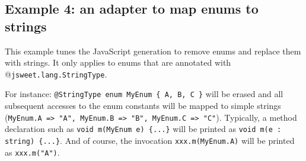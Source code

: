 \documentclass[a4paper]{report}
\begin{document}
\subsection{Example 4: an adapter to map enums to strings}

This example tunes the JavaScript generation to remove enums and
 replace them with strings. It only applies to enums that are annotated with @\texttt{jsweet.lang.StringType}.

For instance: \texttt{@StringType enum MyEnum \{ A, B, C \}} will be erased and all subsequent accesses to the enum constants will be mapped to simple strings (\texttt{MyEnum.A => "A", MyEnum.B => "B", MyEnum.C => "C"}). Typically, a method declaration such as \texttt{void m(MyEnum e) \{...\}} will be printed as \texttt{void m(e : string) \{...\}}. And of course, the invocation \texttt{xxx.m(MyEnum.A)} will be printed as \texttt{xxx.m("A")}.
\end{document}
